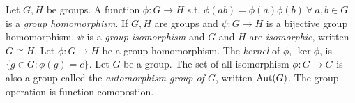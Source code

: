  Let $G, H$ be groups. A function $\phi : G \to H$ s.t. $\phi(ab) = \phi(a)\phi(b)\ \forall\ a,b \in G$  is a \textit{group homomorphism}.
 If $G,H$ are groups and $\psi: G \to H$ is a bijective group homomorphism, $\psi$ is a \textit{group isomorphism} and $G$ and $H$ are \textit{isomorphic}, written $G \cong H$.
 Let $\phi : G \to H$ be a group homomorphism. The \textit{kernel} of $\phi$, $\ker{\phi}$, is $\{g \in G : \phi(g) = e\}$.
 Let $G$ be a group. The set of all isomorphism $\phi: G \to G$ is also a group called the \textit{automorphism group of $G$}, written $\text{Aut}(G)$. The group operation is function comopostion.